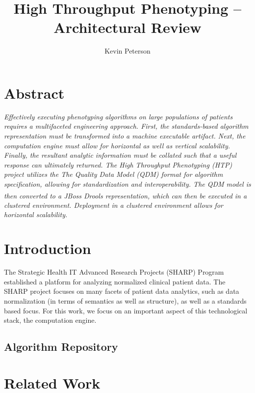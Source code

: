 \documentclass{amia}
\begin{document}
\title{High Throughput Phenotyping -- Architectural Review}

\author{ 
     Kevin Peterson
}


\maketitle

\section*{Abstract}

\textit{Effectively executing phenotyping algorithms on large populations of patients requires a multifaceted engineering approach. First, the standards-based algorithm representation must be transformed into a machine executable artifact. Next, the computation engine must allow for horizontal as well as vertical scalability. Finally, the resultant analytic information must be collated such that a useful response can ultimately returned. The High Throughput Phenotyping (HTP) project utilizes the The Quality Data Model (QDM) format for algorithm specification, allowing for standardization and interoperability. The QDM model is then converted to a JBoss{\textsuperscript{\textregistered}} Drools representation, which can then be executed in a clustered environment. Deployment in a clustered environment allows for horizontal scalability.}

\section*{Introduction}
The Strategic Health IT Advanced Research Projects (SHARP) Program established a platform for analyzing normalized clinical patient data\cite{pathak2013normalization,rea2012building}. The SHARP project focuses on many facets of patient data analytics, such as data normalization (in terms of semantics as well as structure), as well as a standards based focus. For this work, we focus on an important aspect of this technological stack, the computation engine.

\subsection*{Algorithm Repository}

\section*{Related Work}
\end{document}
